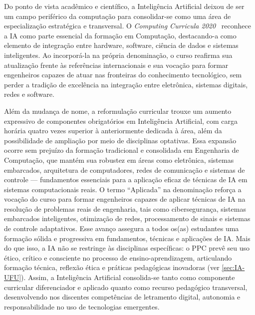 Do ponto de vista acadêmico e científico, a Inteligência Artificial deixou de ser um campo periférico da computação para consolidar-se como uma área de especialização estratégica e transversal. O \textit{Computing Curricula 2020}~\cite{ACM:CC2020} reconhece a IA como parte essencial da formação em Computação, destacando-a como elemento de integração entre hardware, software, ciência de dados e sistemas inteligentes. Ao incorporá-la na própria denominação, o curso reafirma sua atualização frente às referências internacionais e sua vocação para formar engenheiros capazes de atuar nas fronteiras do conhecimento tecnológico, sem perder a tradição de excelência na integração entre eletrônica, sistemas digitais, redes e software.


Além da mudança de nome, a reformulação curricular trouxe um aumento expressivo de componentes obrigatórios em Inteligência Artificial, com carga horária quatro vezes superior à anteriormente dedicada à área, além da possibilidade de ampliação por meio de disciplinas optativas. Essa expansão ocorre sem prejuízo da formação tradicional e consolidada em Engenharia de Computação, que mantém sua robustez em áreas como eletrônica, sistemas embarcados, arquitetura de computadores, redes de comunicação e sistemas de controle — fundamentos essenciais para a aplicação eficaz de técnicas de IA em sistemas computacionais reais. O termo ``Aplicada'' na denominação reforça a vocação do curso para formar engenheiros capazes de aplicar técnicas de IA na resolução de problemas reais de engenharia, tais como cibersegurança, sistemas embarcados inteligentes, otimização de redes, processamento de sinais e sistemas de controle adaptativos. Esse avanço assegura a todos os(as) estudantes uma formação sólida e progressiva em fundamentos, técnicas e aplicações de IA. Mais do que isso, a IA não se restringe às disciplinas específicas: o PPC prevê seu uso ético, crítico e consciente no processo de ensino-aprendizagem, articulando formação técnica, reflexão ética e práticas pedagógicas inovadoras (ver \autoref{sec:IA-UFU}). Assim, a Inteligência Artificial consolida-se tanto como componente curricular diferenciador e aplicado quanto como recurso pedagógico transversal, desenvolvendo nos discentes competências de letramento digital, autonomia e responsabilidade no uso de tecnologias emergentes.

